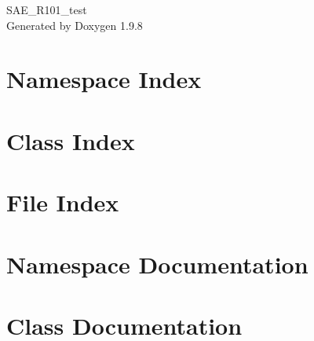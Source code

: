 \documentclass[twoside]{book}
\newcommand{\+}{\discretionary{\mbox{\scriptsize$\hookleftarrow$}}{}{}}
\newcommand{\clearemptydoublepage}{%
    \newpage{\pagestyle{empty}\cleardoublepage}%
  }
\begin{document}
  \raggedbottom
    \hypersetup{pageanchor=false,
                bookmarksnumbered=true,
                pdfencoding=unicode
               }
  \begin{titlepage}
  \vspace*{7cm}
  \begin{center}%
  {\Large SAE\+\_\+\+R101\+\_\+test}\\
  \vspace*{1cm}
  {\large Generated by Doxygen 1.9.8}\\
  \end{center}
  \end{titlepage}
  \clearemptydoublepage
  \tableofcontents
  \clearemptydoublepage
  \hypersetup{pageanchor=true}

\chapter{Namespace Index}

\chapter{Class Index}

\chapter{File Index}

\chapter{Namespace Documentation}












\chapter{Class Documentation}


\end{document}
